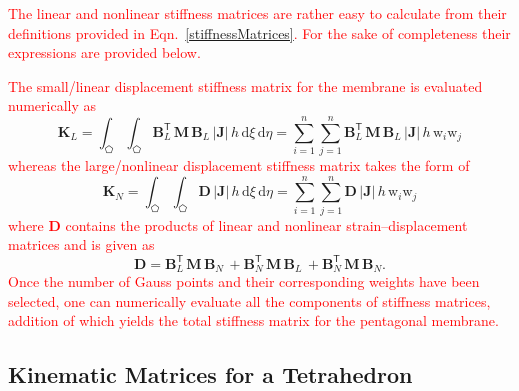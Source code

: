 \textcolor{red}{The linear and nonlinear stiffness matrices are rather easy to calculate from their definitions provided in Eqn.~\eqref{stiffnessMatrices}. For the sake of completeness their expressions are provided below.}

\textcolor{red}{The small/linear displacement stiffness matrix for the membrane is evaluated numerically as} 
\begin{equation}
\mathbf{K}_{L} = \int_{\pentagon} \int_{\pentagon} \mathbf{B}_L^{\mathsf{T}} \, \mathbf{M} \, \mathbf{B}_L \, |\mathbf{J}| \, h \,  \mathrm{d} \xi \,  \mathrm{d} \eta =  \sum_{i=1}^{n} \sum_{j=1}^{n} \mathbf{B}_L^{\mathsf{T}} \, \mathbf{M} \, \mathbf{B}_L \, |\mathbf{J}|  \, h \, \mathrm{w}_i \mathrm{w}_j
\end{equation}
\textcolor{red}{whereas the large/nonlinear displacement stiffness matrix takes the form of}
\begin{equation}
\mathbf{K}_{N} = \int_{\pentagon} \int_{\pentagon} \mathbf{D} \, |\mathbf{J}|\, h \, \mathrm{d} \xi \, \mathrm{d} \eta 
= \sum_{i=1}^{n} \sum_{j=1}^{n} \mathbf{D} \, |\mathbf{J}| \, h \, \mathrm{w}_i \mathrm{w}_j
\end{equation}
\textcolor{red}{where $\mathbf{D}$ contains the products of linear and nonlinear strain--displacement matrices and is given as} 
\begin{equation}
\mathbf{D} = \mathbf{B}_L^{\mathsf{T}} \, \mathbf{M} \, \mathbf{B}_N \, + \mathbf{B}_N^{\mathsf{T}} \, \mathbf{M} \, \mathbf{B}_L \, + \mathbf{B}_N^{\mathsf{T}} \, \mathbf{M} \, \mathbf{B}_N.
\end{equation}
\textcolor{red}{Once the number of Gauss points and their corresponding weights have been selected, one can numerically evaluate all the components of stiffness matrices, addition of which yields the total stiffness matrix for the pentagonal membrane.}


\subsection{Kinematic Matrices for a Tetrahedron}

